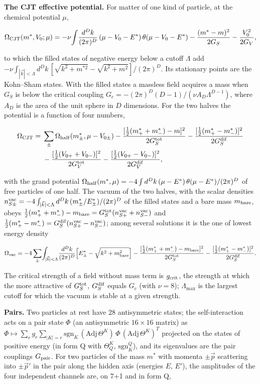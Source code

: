 \documentclass[
  10pt,
]{article}
\begin{document}
\textbf{The CJT effective potential.} For matter of one kind of
particle, at the chemical potential \(\mu\),

\[\Omega_{\rm CJT}(m^*,V_0;\mu)=-\nu\!\int\!\frac{d^Dk}{(2\pi)^D}\,(\mu-V_0-E^*)\,\theta(\mu-V_0-E^*)
-\frac{(m^*-m)^2}{2G_S}-\frac{V_0^2}{2G_V},\]

to which the filled states of negative energy below a cutoff \(\Lambda\)
add
\(-\nu\int_{|\vec k|<\Lambda}d^Dk\,[\sqrt{k^2+m^{*2}}-\sqrt{k^2+m^2}]/(2\pi)^D\).
Its stationary points are the Kohn--Sham states. With the filled states
a massless field acquires a mass when \(G_S\) is below the critical
coupling \(G_c=-(2\pi)^D(D-1)/(\nu A_D\Lambda^{D-1})\), where \(A_D\) is
the area of the unit sphere in \(D\) dimensions. For the two halves the
potential is a function of four numbers,

\[\begin{aligned}
\Omega_{\rm CJT}={}&\sum_\pm\Omega_{\rm half}(m^*_\pm,\mu-V_{0\pm})
-\frac{[\tfrac12(m^*_++m^*_-)-m]^2}{2G_S^{\rm tot}}-\frac{[\tfrac12(m^*_+-m^*_-)]^2}{2G_S^{\rm dif}}\\
&-\frac{[\tfrac12(V_{0+}+V_{0-})]^2}{2G_V^{\rm tot}}-\frac{[\tfrac12(V_{0+}-V_{0-})]^2}{2G_V^{\rm dif}},
\end{aligned}\]

with the grand potential
\(\Omega_{\rm half}(m^*,\mu)=-4\int d^Dk\,(\mu-E^*)\,\theta(\mu-E^*)/(2\pi)^D\)
of free particles of one half. The vacuum of the two halves, with the
scalar densities
\(n_{S\pm}^{\rm vac}=-4\int_{|\vec k|<\Lambda}d^Dk\,(m^*_\pm/E^*_\pm)/(2\pi)^D\)
of the filled states and a bare mass \(m_{\rm bare}\), obeys
\(\tfrac12(m^*_++m^*_-)-m_{\rm bare}=G_S^{\rm tot}(n_{S+}^{\rm vac}+n_{S-}^{\rm vac})\)
and
\(\tfrac12(m^*_+-m^*_-)=G_S^{\rm dif}(n_{S+}^{\rm vac}-n_{S-}^{\rm vac})\);
among several solutions it is the one of lowest energy density

\[\Omega_{\rm vac}=-4\sum_\pm\!\int_{|\vec k|<\Lambda}\!\frac{d^Dk}{(2\pi)^D}\Big[E^*_\pm-\sqrt{k^2+m_{\rm bare}^2}\Big]
-\frac{[\tfrac12(m^*_++m^*_-)-m_{\rm bare}]^2}{2G_S^{\rm tot}}-\frac{[\tfrac12(m^*_+-m^*_-)]^2}{2G_S^{\rm dif}} .\]

The critical strength of a field without mass term is \(g_{\rm crit}\),
the strength at which the more attractive of \(G_S^{\rm tot}\),
\(G_S^{\rm dif}\) equals \(G_c\) (with \(\nu=8\)); \(\Lambda_{\max}\) is
the largest cutoff for which the vacuum is stable at a given strength.

\textbf{Pairs.} Two particles at rest have 28 antisymmetric states; the
self-interaction acts on a pair state \(\Phi\) (an antisymmetric
\(16\times16\) matrix) as
\(\Phi\mapsto\sum_rg_r\sum_{|K|=r}\mathrm{sgn}_K\,(\mathrm{Adj}\,\Theta^K)\,\Phi\,(\mathrm{Adj}\,\Theta^K)^T\)
projected on the states of positive energy (in form Q with
\(\Theta_Q^K\), \(\mathrm{sgn}_K^Q\)), and its eigenvalues are the pair
couplings \(G_{\rm pair}\). For two particles of the mass \(m^*\) with
momenta \(\pm\vec p\) scattering into \(\pm\vec p'\) in the pair along
the hidden axis (energies \(E\), \(E'\)), the amplitudes of the four
independent channels are, on 7+1 and in form Q,
\end{document}

